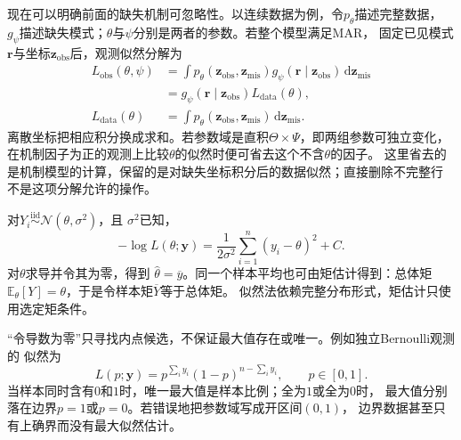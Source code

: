 现在可以明确前面的缺失机制可忽略性。以连续数据为例，令\(p_\theta\)描述完整数据，
\(g_\psi\)描述缺失模式；\(\theta\)与\(\psi\)分别是两者的参数。若整个模型满足MAR，
固定已见模式\(\bm r\)与坐标\(\bm z_{\mathrm{obs}}\)后，观测似然分解为
\begin{equation}
\begin{aligned}
 L_{\mathrm{obs}}(\theta,\psi)
 &=\int p_\theta(\bm z_{\mathrm{obs}},\bm z_{\mathrm{mis}})
       g_\psi(\bm r\mid\bm z_{\mathrm{obs}})\,\mathrm d\bm z_{\mathrm{mis}}\\
 &=g_\psi(\bm r\mid\bm z_{\mathrm{obs}})
       L_{\mathrm{data}}(\theta),\\
 L_{\mathrm{data}}(\theta)
 &=\int p_\theta(\bm z_{\mathrm{obs}},\bm z_{\mathrm{mis}})
       \,\mathrm d\bm z_{\mathrm{mis}}.
\end{aligned}
\label{eq:statistics-missing-likelihood}
\end{equation}
离散坐标把相应积分换成求和。若参数域是直积\(\Theta\times\Psi\)，即两组参数可独立变化，
在机制因子为正的观测上比较\(\theta\)的似然时便可省去这个不含\(\theta\)的因子。
这里省去的是机制模型的计算，保留的是对缺失坐标积分后的数据似然；直接删除不完整行
不是这项分解允许的操作。

对\(Y_i\overset{\mathrm{iid}}{\sim}\mathcal{N}(\theta,\sigma^2)\)，且
\(\sigma^2\)已知，
\[
  -\log L(\theta;\bm{y})
  =\frac{1}{2\sigma^2}\sum_{i=1}^n(y_i-\theta)^2+C.
\]
对\(\theta\)求导并令其为零，得到
\(\widehat\theta=\overline y\)。同一个样本平均也可由矩估计得到：总体矩
\(\mathbb{E}_\theta[Y]=\theta\)，于是令样本矩\(\overline Y\)等于总体矩。
似然法依赖完整分布形式，矩估计只使用选定矩条件。

“令导数为零”只寻找内点候选，不保证最大值存在或唯一。例如独立Bernoulli观测的
似然为
\[
  L(p;\bm y)=p^{\sum_i y_i}(1-p)^{n-\sum_i y_i},\qquad p\in[0,1].
\]
当样本同时含有\(0\)和\(1\)时，唯一最大值是样本比例；全为\(1\)或全为\(0\)时，
最大值分别落在边界\(p=1\)或\(p=0\)。若错误地把参数域写成开区间\((0,1)\)，
边界数据甚至只有上确界而没有最大似然估计。

